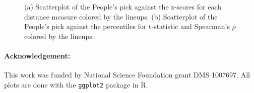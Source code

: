 \begin{figure}[htbp]
\centering
{}
\label{dist_z_perc}
	\vspace{-.1in}
\caption[Optional caption for list of figures]{(a) Scatterplot of the People's pick against the z-scores for each distance measure colored by the lineups. (b) Scatterplot of the People's pick against the percentiles for t-statistic and Spearman's $\rho$ colored by the lineups. }
\end{figure}


     
        
% 
\paragraph{Acknowledgement:}

This work was funded by National Science Foundation grant DMS 1007697. All plots are done with the {\tt ggplot2} \citep{hadley:2009} package in R.
